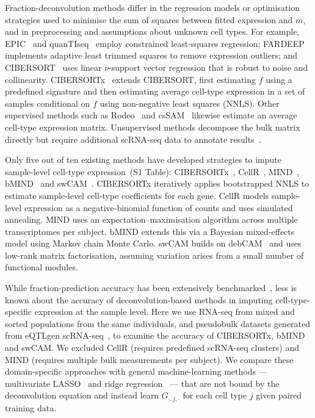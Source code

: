 \documentclass[11pt]{article}
\begin{document}
Fraction-deconvolution methods differ in the regression models or optimisation strategies used to minimise the sum of squares between fitted expression and $m$, and in preprocessing and assumptions about unknown cell types. For example, EPIC~\citep{racle2017epic} and quanTIseq~\citep{finotello2019quantiseq} employ constrained least-squares regression; FARDEEP~\citep{hao2019fardeep} implements adaptive least trimmed squares to remove expression outliers; and CIBERSORT~\citep{newman2015cibersort} uses linear $\nu$-support vector regression that is robust to noise and collinearity. CIBERSORTx~\citep{newman2019cibersortx} extends CIBERSORT, first estimating $f$ using a predefined signature and then estimating average cell-type expression in a set of samples conditional on $f$ using non-negative least squares (NNLS). Other supervised methods such as Rodeo~\citep{gong2011rodeo} and csSAM~\citep{shen2010cssam} likewise estimate an average cell-type expression matrix. Unsupervised methods decompose the bulk matrix directly but require additional scRNA-seq data to annotate results~\citep{wang2016debcam,wang2019bulk}.

Only five out of ten existing methods have developed strategies to impute sample-level cell-type expression~(S1 Table): CIBERSORTx~\citep{newman2019cibersortx}, CellR~\citep{mehran2021cellr}, MIND~\citep{wang2020mind}, bMIND~\citep{wang2021bmind} and swCAM~\citep{chen2022swcam}. CIBERSORTx iteratively applies bootstrapped NNLS to estimate sample-level cell-type coefficients for each gene. CellR models sample-level expression as a negative-binomial function of counts and uses simulated annealing. MIND uses an expectation--maximisation algorithm across multiple transcriptomes per subject. bMIND extends this via a Bayesian mixed-effects model using Markov chain Monte Carlo. swCAM builds on debCAM~\citep{wang2016debcam} and uses low-rank matrix factorisation, assuming variation arises from a small number of functional modules.

While fraction-prediction accuracy has been extensively benchmarked~\citep{cobb2020deconvbench,jin2021scscores,sturm2019benchmark}, less is known about the accuracy of deconvolution-based methods in imputing cell-type-specific expression at the sample level. Here we use RNA-seq from mixed and sorted populations from the same individuals, and pseudobulk datasets generated from eQTLgen scRNA-seq~\citep{oosterhoff2023eqtlgen}, to examine the accuracy of CIBERSORTx, bMIND and swCAM. We excluded CellR (requires predefined scRNA-seq clusters) and MIND (requires multiple bulk measurements per subject). We compare these domain-specific approaches with general machine-learning methods --- multivariate LASSO~\citep{tibshirani1996lasso} and ridge regression~\citep{hoerl1970ridge} --- that are not bound by the deconvolution equation and instead learn $G_{\cdot,j,\cdot}$ for each cell type $j$ given paired training data.
\end{document}
